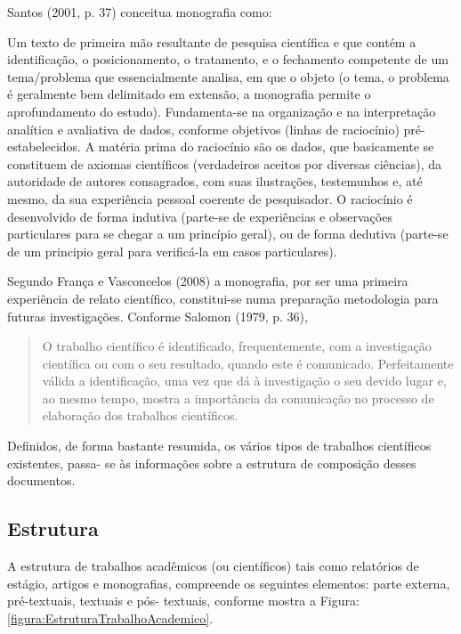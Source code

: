 \documentclass[a4paper,12pt]{article}  %
\begin{document}
\begin{ElementosTextuais}
\begin{Desenvolvimento}
Santos (2001, p. 37) conceitua monografia como:
\begin{citacaodireta}
Um texto de primeira mão resultante de pesquisa científica e que contém a identificação, o posicionamento, o tratamento, e o fechamento competente de um tema/problema que essencialmente analisa, em que o objeto (o tema, o problema é geralmente bem delimitado em extensão, a monografia permite o aprofundamento do estudo). Fundamenta-se na organização e na interpretação analítica e avaliativa de dados, conforme objetivos (linhas de raciocínio) pré-estabelecidos. A matéria prima do raciocínio são os dados, que basicamente se constituem de axiomas científicos (verdadeiros aceitos por diversas ciências), da autoridade de autores consagrados, com suas ilustrações, testemunhos e, até mesmo, da sua experiência pessoal coerente de pesquisador. O raciocínio é desenvolvido de forma indutiva (parte-se de experiências e observações particulares para se chegar a um princípio geral), ou de forma dedutiva (parte-se de um principio geral para verificá-la em casos particulares).
\end{citacaodireta}

Segundo França e Vasconcelos (2008) a monografia, por ser uma primeira experiência de relato científico, constitui-se numa preparação metodologia para futuras investigações. Conforme Salomon (1979, p. 36),

\begin{quotation}
O trabalho científico é identificado, frequentemente, com a investigação científica ou com o seu resultado, quando este é comunicado. Perfeitamente válida a identificação, uma vez que dá à investigação o seu devido lugar e, ao mesmo tempo, mostra a importância da comunicação no processo de elaboração dos trabalhos científicos.
\end{quotation}

Definidos, de forma bastante resumida, os vários tipos de trabalhos científicos existentes, passa- se às informações sobre a estrutura de composição desses documentos.

\subsection{Estrutura}
A estrutura de trabalhos acadêmicos (ou científicos) tais como relatórios de estágio, artigos e monografias, compreende os seguintes elementos: parte externa, pré-textuais, textuais e pós- textuais, conforme mostra a Figura: \ref{figura:EstruturaTrabalhoAcademico}.


\end{Desenvolvimento}
\end{ElementosTextuais}
\end{document}
